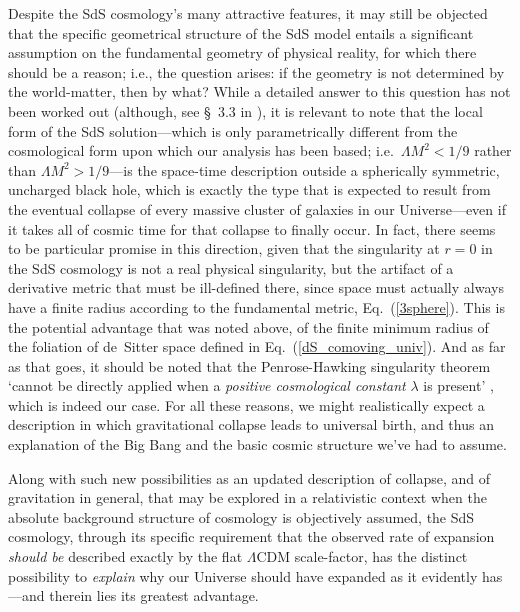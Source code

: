 \documentclass[11pt]{article}
\begin{document}
\begin{appendix}
Despite the SdS cosmology's many attractive features, it may still be objected that the specific geometrical structure of the SdS model entails a significant assumption on the fundamental geometry of physical reality, for which there should be a reason; i.e., the question arises: if the geometry is not determined by the world-matter, then by what? While a detailed answer to this question has not been worked out (although, see \S~3.3 in \cite{Janzen2012}), it is relevant to note that the local form of the SdS solution---which is only parametrically different from the cosmological form upon which our analysis has been based; i.e.\ ${\Lambda}M^2<1/9$ rather than ${\Lambda}M^2>1/9$---is the space-time description outside a spherically symmetric, uncharged black hole, which is exactly the type that is expected to result from the eventual collapse of every massive cluster of galaxies in our Universe---even if it takes all of cosmic time for that collapse to finally occur. In fact, there seems to be particular promise in this direction, given that the singularity at $r=0$ in the SdS cosmology is not a real physical singularity, but the artifact of a derivative metric that must be ill-defined there, since space must actually always have a finite radius according to the fundamental metric, Eq.~(\ref{3sphere}). This is the potential advantage that was noted above, of the finite minimum radius of the foliation of de~Sitter space defined in Eq.~(\ref{dS_comoving_univ}). And as far as that goes, it should be noted that the Penrose-Hawking singularity theorem `cannot be directly applied when a \textit{positive cosmological constant} $\lambda$ is present' \cite{Hawking1970}, which is indeed our case. For all these reasons, we might realistically expect a description in which gravitational collapse leads to universal birth, and thus an explanation of the Big Bang and the basic cosmic structure we've had to assume.

Along with such new possibilities as an updated description of collapse, and of gravitation in general, that may be explored in a relativistic context when the absolute background structure of cosmology is objectively assumed, the SdS cosmology, through its specific requirement that the observed rate of expansion \textit{should be} described exactly by the flat $\Lambda$CDM scale-factor, has the distinct possibility to \textit{explain} why our Universe should have expanded as it evidently has---and therein lies its greatest advantage.

\end{appendix}
\end{document}

